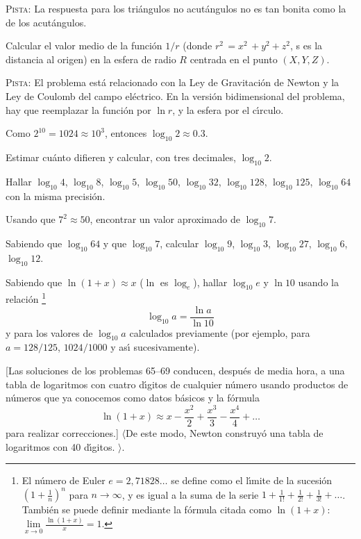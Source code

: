 \documentclass[12pt]{article}  %
\begin{document}
\textsc{Pista:} La respuesta para los tri\'angulos no acut\'angulos no es tan bonita como la de los acut\'angulos.


\bigskip
{} Calcular el valor medio de la funci\'on $1/r$ (donde
$r^2\,=x^2\,+y^2+z^2$, 
\newline
s es la distancia al origen) en la esfera de radio 
$R$ centrada en el punto $(X,Y,Z)$.

\medskip
\textsc{Pista:} El problema est\'a relacionado con la Ley de Gravitaci\'on de Newton y la Ley de Coulomb del campo el\'ectrico.
En la versi\'on bidimensional del problema, hay que reemplazar la funci\'on por $\ln r$, y la esfera por el c\'{\i}rculo.


\bigskip
{} Como $2^{10}=1024 \approx 10^3$, entonces
$\log_{10} 2 \approx 0{.}3$.

Estimar cu\'anto difieren y calcular, con tres decimales, $\log_{10} 2$. 

\bigskip
{} Hallar $\log_{10} 4$, $\log_{10} 8$,
$\log_{10} 5$, $\log_{10} 50$, $\log_{10} 32$, $\log_{10} 128$,
$\log_{10} 125$, $\log_{10} 64$ con la misma precisi\'on.

\bigskip
{} Usando que $7^2 \approx 50$, encontrar un valor aproximado de $\log_{10} 7$.

\bigskip
{} Sabiendo que $\log_{10} 64$ y que $\log_{10} 7$, calcular $\log_{10} 9$, $\log_{10} 3$,
    $\log_{10} 27$, $\log_{10} 6$, $\log_{10} 12$.

\bigskip
{} Sabiendo que $\ln (1+x) \approx x$ ($\ln$ es $\log_e$), hallar $\log_{10} e$ y
    $\ln 10$ usando la relaci\'on \footnote{
El n\'umero de Euler $e = 2{,}71828\dots$ se define como el l\'{\i}mite de la sucesi\'on
  $\left(1+\frac1n\right)^n$ para $n\to \infty$, y es igual a la suma de la serie  
$1+\frac 1{1!} +\frac 1{2!}+\frac 1{3!}+\dots$. Tambi\'en se puede definir mediante la f\'ormula citada como
 $\ln (1+x)$: $\lim\limits_{x\to 0}\frac{\ln(1+x)}{x} = 1$.}\vspace{-\jot}
%
$$
\log_{10} a=\frac{\ln a}{\ln 10}
$$ 
y para los valores de $\log_{10} a$ calculados previamente (por ejemplo, para $a=128/125$, $1024/1000$
y as\'{\i} sucesivamente).

[Las soluciones de los problemas 65--69 conducen, despu\'es de media hora, a una tabla de logaritmos con cuatro d\'{\i}gitos de cualquier n\'umero usando productos de n\'umeros que ya conocemos como datos b\'asicos y la f\'ormula  
\vspace{-2\jot}
\[
\ln (1+x) \approx x-\frac{x^2}{2}+\frac{x^3}{3}-\frac{x^4}{4}+\dots
\]
para realizar correcciones.] $\langle$De este modo, Newton construy\'o una tabla de logaritmos con 40 d\'{\i}gitos.%
$\rangle$.
\end{document}

